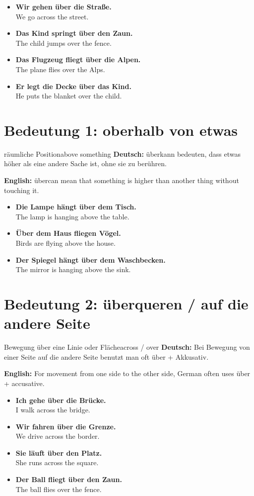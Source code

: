 \documentclass[a4paper,11pt]{article}
\newcommand{\GermanText}[1]{\textbf{Deutsch: }#1\par}
\newcommand{\EnglishText}[1]{{\small\color{SoftGray}\textbf{English: }#1\par}}
\newcommand{\ExampleItem}[2]{\item \textbf{#1}\\{\small\color{SoftGray}#2}}
\begin{document}
\begin{exbox}
\begin{itemize}
    \ExampleItem{Wir gehen über die Straße.}{We go across the street.}
    \ExampleItem{Das Kind springt über den Zaun.}{The child jumps over the fence.}
    \ExampleItem{Das Flugzeug fliegt über die Alpen.}{The plane flies over the Alps.}
    \ExampleItem{Er legt die Decke über das Kind.}{He puts the blanket over the child.}
\end{itemize}
\end{exbox}

\section{Bedeutung 1: oberhalb von etwas}

\begin{grammarentry}{räumliche Position}{above something}
\GermanText{\glqq über\grqq kann bedeuten, dass etwas höher als eine andere Sache ist, ohne sie zu berühren.}
\EnglishText{\glqq über\grqq can mean that something is higher than another thing without touching it.}
\end{grammarentry}

\begin{exbox}
\begin{itemize}
    \ExampleItem{Die Lampe hängt über dem Tisch.}{The lamp is hanging above the table.}
    \ExampleItem{Über dem Haus fliegen Vögel.}{Birds are flying above the house.}
    \ExampleItem{Der Spiegel hängt über dem Waschbecken.}{The mirror is hanging above the sink.}
\end{itemize}
\end{exbox}

\section{Bedeutung 2: überqueren / auf die andere Seite}

\begin{grammarentry}{Bewegung über eine Linie oder Fläche}{across / over}
\GermanText{Bei Bewegung von einer Seite auf die andere Seite benutzt man oft \glqq über + Akkusativ\grqq.}
\EnglishText{For movement from one side to the other side, German often uses \glqq über + accusative\grqq.}
\end{grammarentry}

\begin{exbox}
\begin{itemize}
    \ExampleItem{Ich gehe über die Brücke.}{I walk across the bridge.}
    \ExampleItem{Wir fahren über die Grenze.}{We drive across the border.}
    \ExampleItem{Sie läuft über den Platz.}{She runs across the square.}
    \ExampleItem{Der Ball fliegt über den Zaun.}{The ball flies over the fence.}
\end{itemize}
\end{exbox}
\end{document}
